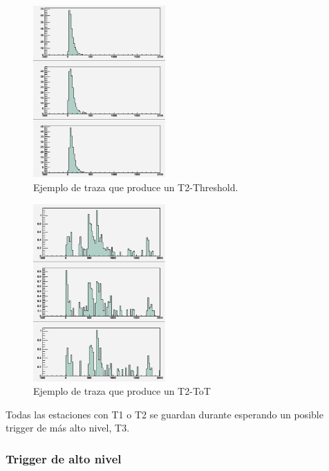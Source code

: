 			\begin{figure}[h!]
				\begin{center}
				\includegraphics[width=0.45\textwidth]{fig/detectorAuger/Threshold}
				\caption{\label{fig:t2_th} Ejemplo de traza que produce un T2-Threshold.}
				\end{center}
			\end{figure}
			\begin{figure}[h!]
				\begin{center}
				\includegraphics[width=0.45\textwidth]{fig/detectorAuger/ToT}
				\caption{\label{fig:t2_tot} Ejemplo de traza que produce un T2-ToT}
				\end{center}
			\end{figure}
			
			Todas las estaciones con T1 o T2 se guardan durante  esperando un posible trigger de m\'as alto nivel, T3.
			
			\subsubsection*{Trigger de alto nivel}
			
